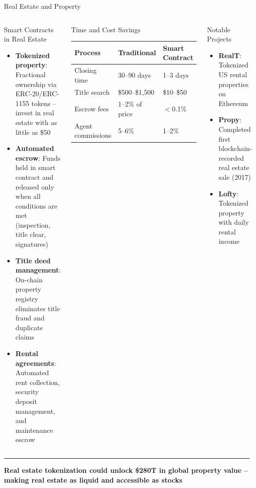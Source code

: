 \documentclass[8pt,aspectratio=169]{beamer}
\newcommand{\bottomnote}[1]{\vfill\vspace{-2mm}\textcolor{mllavender2}{\rule{\textwidth}{0.4pt}}\vspace{1mm}\footnotesize\textbf{#1}}
\begin{document}
\begin{frame}{Real Estate and Property}
\begin{columns}[T]
\begin{block}{Smart Contracts in Real Estate}
\footnotesize
\begin{itemize}
  \item \textbf{Tokenized property}: Fractional ownership via ERC-20/ERC-1155 tokens -- invest in real estate with as little as \$50
  \item \textbf{Automated escrow}: Funds held in smart contract and released only when all conditions are met (inspection, title clear, signatures)
  \item \textbf{Title deed management}: On-chain property registry eliminates title fraud and duplicate claims
  \item \textbf{Rental agreements}: Automated rent collection, security deposit management, and maintenance escrow
\end{itemize}
\end{block}

\begin{block}{Time and Cost Savings}
\footnotesize
\begin{tabular}{l l l}
\toprule
\textbf{Process} & \textbf{Traditional} & \textbf{Smart Contract} \\
\midrule
\rowcolor{mllavender4}
Closing time & 30--90 days & 1--3 days \\
Title search & \$500--\$1,500 & \$10--\$50 \\
\rowcolor{mllavender4}
Escrow fees & 1--2\% of price & $<$0.1\% \\
Agent commissions & 5--6\% & 1--2\% \\
\bottomrule
\end{tabular}
\end{block}
\vspace{2mm}
\begin{exampleblock}{Notable Projects}
\footnotesize
\begin{itemize}
  \item \textbf{RealT}: Tokenized US rental properties on Ethereum
  \item \textbf{Propy}: Completed first blockchain-recorded real estate sale (2017)
  \item \textbf{Lofty}: Tokenized property with daily rental income
\end{itemize}
\end{exampleblock}
\end{columns}
\bottomnote{Real estate tokenization could unlock \$280T in global property value -- making real estate as liquid and accessible as stocks}
\end{frame}
\end{document}
